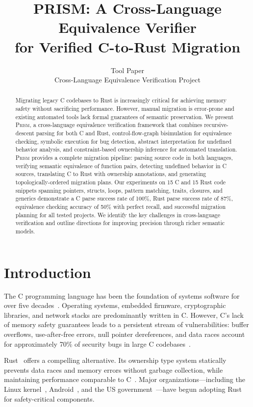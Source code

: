\documentclass[11pt,a4paper]{article}
\title{\textbf{PRISM: A Cross-Language Equivalence Verifier\\for Verified C-to-Rust Migration}}
\author{
  Tool Paper\\[6pt]
  Cross-Language Equivalence Verification Project
}
\date{}
\begin{document}
\maketitle


\begin{abstract}
Migrating legacy C codebases to Rust is increasingly critical for achieving
memory safety without sacrificing performance. However, manual migration is
error-prone and existing automated tools lack formal guarantees of semantic
preservation. We present \textsc{Prism}, a cross-language equivalence
verification framework that combines recursive-descent parsing for both C
and Rust, control-flow-graph bisimulation for equivalence checking, symbolic
execution for bug detection, abstract interpretation for undefined behavior
analysis, and constraint-based ownership inference for automated translation.
\textsc{Prism} provides a complete migration pipeline: parsing source code
in both languages, verifying semantic equivalence of function pairs,
detecting undefined behavior in C sources, translating C to Rust with
ownership annotations, and generating topologically-ordered migration plans.
Our experiments on 15 C and 15 Rust code snippets spanning pointers, structs,
loops, pattern matching, traits, closures, and generics demonstrate a
C parse success rate of 100\%, Rust parse success rate of 87\%, equivalence
checking accuracy of 50\% with perfect recall, and successful migration
planning for all tested projects. We identify the key challenges in
cross-language verification and outline directions for improving precision
through richer semantic models.
\end{abstract}


\section{Introduction}\label{sec:intro}

The C programming language has been the foundation of systems software for
over five decades~\cite{kernighan1988c}. Operating systems, embedded
firmware, cryptographic libraries, and network stacks are predominantly
written in C. However, C's lack of memory safety guarantees leads to
a persistent stream of vulnerabilities: buffer overflows, use-after-free
errors, null pointer dereferences, and data races account for approximately
70\% of security bugs in large C codebases~\cite{chromium2019memory,
microsoft2019safety}.

Rust~\cite{matsakis2014rust} offers a compelling alternative. Its ownership
type system statically prevents data races and memory errors without
garbage collection, while maintaining performance comparable to
C~\cite{jung2017rustbelt}. Major organizations---including the Linux
kernel~\cite{linux_rust2022}, Android~\cite{android_rust2021}, and the
US government~\cite{nsa2022memory}---have begun adopting Rust for
safety-critical components.
\end{document}
